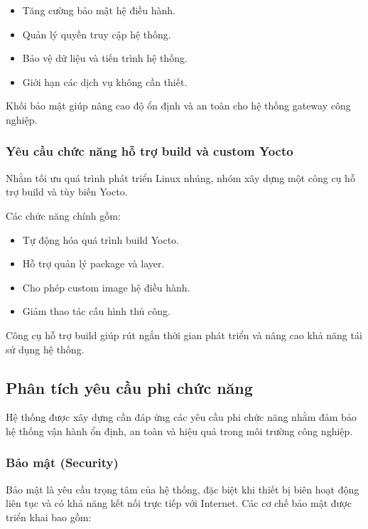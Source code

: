 \begin{itemize}
    \item Tăng cường bảo mật hệ điều hành.
    \item Quản lý quyền truy cập hệ thống.
    \item Bảo vệ dữ liệu và tiến trình hệ thống.
    \item Giới hạn các dịch vụ không cần thiết.
\end{itemize}


Khối bảo mật giúp nâng cao độ ổn định và an toàn cho hệ thống gateway công nghiệp.


\subsubsection{Yêu cầu chức năng hỗ trợ build và custom Yocto}


Nhằm tối ưu quá trình phát triển Linux nhúng, nhóm xây dựng một công cụ hỗ trợ build và tùy biến Yocto.


Các chức năng chính gồm:


\begin{itemize}
    \item Tự động hóa quá trình build Yocto.
    \item Hỗ trợ quản lý package và layer.
    \item Cho phép custom image hệ điều hành.
    \item Giảm thao tác cấu hình thủ công.
\end{itemize}


Công cụ hỗ trợ build giúp rút ngắn thời gian phát triển và nâng cao khả năng tái sử dụng hệ thống.

\subsection{Phân tích yêu cầu phi chức năng}

Hệ thống được xây dựng cần đáp ứng các yêu cầu phi chức năng nhằm đảm bảo hệ thống vận hành ổn định, an toàn và hiệu quả trong môi trường công nghiệp.

\subsubsection{Bảo mật (Security)}

Bảo mật là yêu cầu trọng tâm của hệ thống, đặc biệt khi thiết bị biên hoạt động liên tục và có khả năng kết nối trực tiếp với Internet. Các cơ chế bảo mật được triển khai bao gồm:

